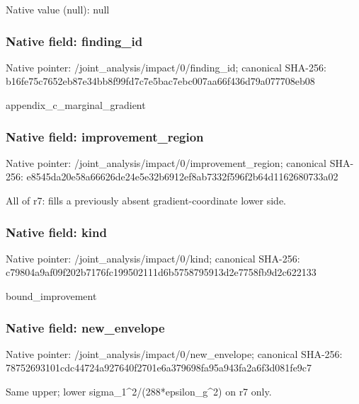 \documentclass[10pt,a4paper]{article}
\begin{document}
Native value (null): null

\subsubsection{Native field: finding\_\allowbreak{}id}
Native pointer: /joint\_\allowbreak{}analysis/impact/0/finding\_\allowbreak{}id; canonical SHA-256: b16fe75c7652eb87e34bb8f99fd7c7e5bac7ebc007aa66f436d79a077708eb08

\begingroup\raggedright\sloppy appendix\_\allowbreak{}c\_\allowbreak{}marginal\_\allowbreak{}gradient\par\endgroup

\subsubsection{Native field: improvement\_\allowbreak{}region}
Native pointer: /joint\_\allowbreak{}analysis/impact/0/improvement\_\allowbreak{}region; canonical SHA-256: e8545da20e58a66626de24e5e32b6912ef8ab7332f596f2b64d1162680733a02

\begingroup\raggedright\sloppy All of r7:\allowbreak{} fills a previously absent gradient-coordinate lower side.\par\endgroup

\subsubsection{Native field: kind}
Native pointer: /joint\_\allowbreak{}analysis/impact/0/kind; canonical SHA-256: c79804a9af09f202b7176fc199502111d6b5758795913d2e7758fb9d2c622133

\begingroup\raggedright\sloppy bound\_\allowbreak{}improvement\par\endgroup

\subsubsection{Native field: new\_\allowbreak{}envelope}
Native pointer: /joint\_\allowbreak{}analysis/impact/0/new\_\allowbreak{}envelope; canonical SHA-256: 78752693101cdc44724a927640f2701e6a379698fa95a943fa2a6f3d081fe9c7

\begingroup\raggedright\sloppy Same upper;\allowbreak{} lower sigma\_\allowbreak{}1\textasciicircum{}2/\allowbreak{}(288*epsilon\_\allowbreak{}g\textasciicircum{}2) on r7 only.\par\endgroup
\end{document}
